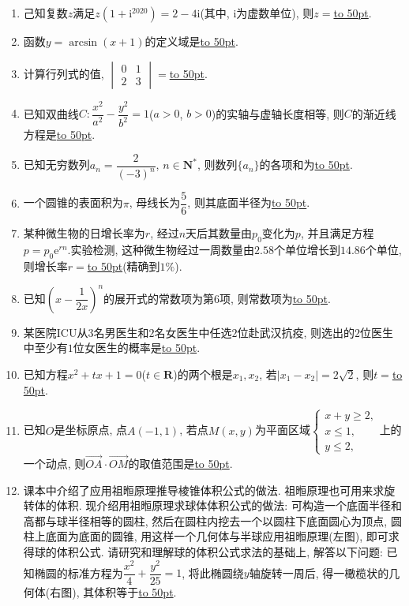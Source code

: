 \documentclass[10pt,a4paper]{article}
\newcommand{\blank}[1]{\underline{\hbox to #1pt{}}}
\begin{document}
\begin{enumerate}[1.]
\item 己知复数$z$满足$z(1+\mathrm{i}^{2020})=2-4\mathrm{i}$(其中, $\mathrm{i}$为虚数单位), 则$z=$\blank{50}.
\item 函数$y=\arcsin (x+1)$的定义域是\blank{50}.
\item 计算行列式的值, $\begin{vmatrix}0 & 1  \\2 & 3  \end{vmatrix}=$\blank{50}.
\item 已知双曲线$C:\dfrac{x^2}{a^2}-\dfrac{y^2}{b^2}=1$($a>0$, $b>0$)的实轴与虚轴长度相等, 则$C$的渐近线方程是\blank{50}.
\item 已知无穷数列$a_n=\dfrac 2{(-3)^n}$, $n\in \mathbf{N}^*$, 则数列$\{a_n\}$的各项和为\blank{50}.
\item 一个圆锥的表面积为$\pi$, 母线长为$\dfrac 56$, 则其底面半径为\blank{50}.
\item 某种微生物的日增长率为$r$, 经过$n$天后其数量由$p_0$变化为$p$, 并且满足方程$p=p_0\mathrm{e}^{rn}$.实验检测, 这种微生物经过一周数量由$2.58$个单位增长到$14.86$个单位, 则增长率$r=$\blank{50}(精确到$1\%$).
\item 已知$(x-\dfrac 1{2x})^n$的展开式的常数项为第$6$项, 则常数项为\blank{50}.
\item 某医院ICU从$3$名男医生和$2$名女医生中任选$2$位赴武汉抗疫, 则选出的$2$位医生中至少有$1$位女医生的概率是\blank{50}.
\item 已知方程$x^2+tx+1=0$($t\in \mathbf{R}$)的两个根是$x_1,x_2$, 若$|x_1-x_2|=2\sqrt 2$, 则$t=$\blank{50}.
\item 已知$O$是坐标原点, 点$A(-1,1)$, 若点$M(x,y)$为平面区域$\begin{cases} x+y\ge 2, \\ x\le 1, \\ y\le 2, \end{cases}$上的一个动点, 则$\overrightarrow{OA}\cdot \overrightarrow{OM}$的取值范围是\blank{50}.
\item 课本中介绍了应用祖暅原理推导棱锥体积公式的做法. 祖暅原理也可用来求旋转体的体积. 现介绍用祖暅原理求球体体积公式的做法: 可构造一个底面半径和高都与球半径相等的圆柱, 然后在圆柱内挖去一个以圆柱下底面圆心为顶点, 圆柱上底面为底面的圆锥, 用这样一个几何体与半球应用祖暅原理(左图), 即可求得球的体积公式. 请研究和理解球的体积公式求法的基础上, 解答以下问题: 已知椭圆的标准方程为$\dfrac{x^2}4+\dfrac{y^2}{25}=1$, 将此椭圆绕$y$轴旋转一周后, 得一橄榄状的几何体(右图), 其体积等于\blank{50}.
\begin{center}
    \begin{tikzpicture}

\end{tikzpicture}
\end{center}
\end{enumerate}
\end{document}
